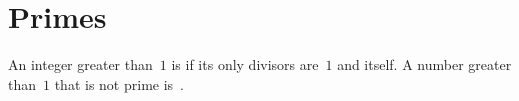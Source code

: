 \documentclass{test}  %
\begin{document}
\begin{bezoutproof}
\begin{problem}
\end{problem}
\end{bezoutproof}











\section{Primes}
\begin{df}
An integer greater than~$1$
is  if its only divisors are~$1$ and itself.
A number greater than~$1$ that is not prime is~.  
\end{df}
\end{document}
